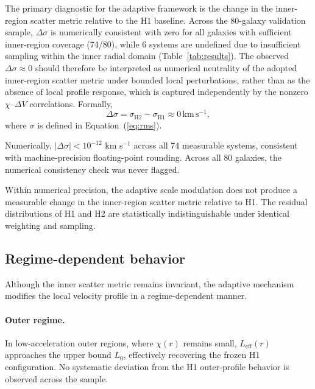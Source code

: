 \documentclass[twocolumn,linenumbers]{aastex701}
\begin{document}
The primary diagnostic for the adaptive framework is the change in the
inner-region scatter metric relative to the H1 baseline. Across the
80-galaxy validation sample, $\Delta\sigma$ is numerically consistent
with zero for all galaxies with sufficient inner-region coverage (74/80),
while 6 systems are undefined due to insufficient sampling within the
inner radial domain (Table~\ref{tab:results}).
The observed $\Delta\sigma \approx 0$ should therefore be interpreted as
numerical neutrality of the adopted inner-region scatter metric under bounded
local perturbations, rather than as the absence of local profile response,
which is captured independently by the nonzero $\chi$--$\Delta V$ correlations.
Formally,
\begin{equation}
	\Delta\sigma = \sigma_{\mathrm{H2}} - \sigma_{\mathrm{H1}}
	\approx 0\,\mathrm{km\,s^{-1}},
	\label{eq:delta_sigma}
\end{equation}
where $\sigma$ is defined in Equation~(\ref{eq:rms}).

Numerically, $|\Delta\sigma| < 10^{-12}$ km s$^{-1}$ across all 74
measurable systems, consistent with machine-precision floating-point
rounding. Across all 80 galaxies, the numerical consistency check was
never flagged.

Within numerical precision, the adaptive scale modulation does not produce
a measurable change in the inner-region scatter metric relative to H1.
The residual distributions of H1 and H2 are statistically indistinguishable
under identical weighting and sampling.

\subsection{Regime-dependent behavior}

Although the inner scatter metric remains invariant, the adaptive mechanism
modifies the local velocity profile in a regime-dependent manner.

\paragraph{Outer regime.}
In low-acceleration outer regions, where $\chi(r)$ remains small,
$L_{\mathrm{eff}}(r)$ approaches the upper bound $L_0$, effectively
recovering the frozen H1 configuration. No systematic deviation from
the H1 outer-profile behavior is observed across the sample.
\end{document}
